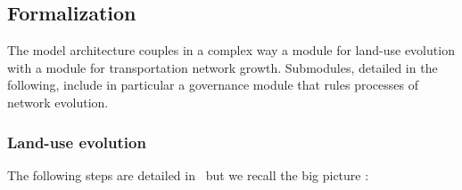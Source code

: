 



\subsection{Formalization}


The model architecture couples in a complex way a module for land-use evolution with a module for transportation network growth. Submodules, detailed in the following, include in particular a governance module that rules processes of network evolution.


\subsubsection{Land-use evolution}

The following steps are detailed in~\cite{lenechet2012} but we recall the big picture :

